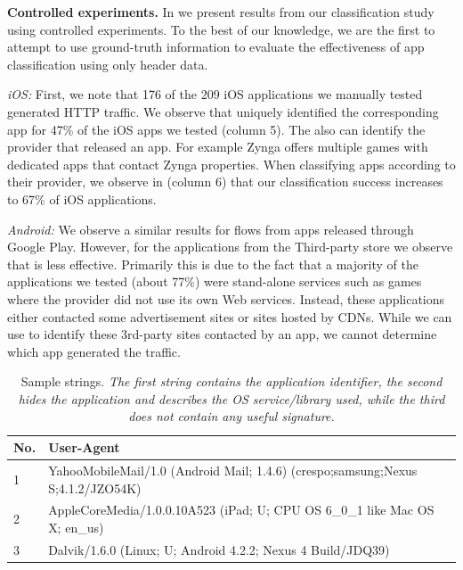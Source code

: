 
\noindent\textbf{Controlled experiments.}
In  we present results from our classification study using controlled experiments. To 
the best of our knowledge, we are the first to attempt to use ground-truth information to evaluate the 
effectiveness of app classification using only header data.
 

\emph{iOS:}
First, we note that 176 of the 209 iOS applications we manually tested generated HTTP traffic.
We observe that \httphost uniquely identified the corresponding app for 47\% of the iOS apps we tested (column 5).
The \httphost also can identify the provider that released an app.
For example Zynga offers multiple games with dedicated apps that contact Zynga properties.
When classifying apps according to their provider, we observe in  (column 6) that our classification success increases to 67\% of iOS applications. 


\emph{Android:} We observe a similar results for flows from apps released through Google Play.
However, for the applications from the Third-party store we observe that \httphost is less effective. 
Primarily this is due to the fact that a majority of the applications we tested (about 77\%) were stand-alone services such as games where the provider did not use its own Web services. Instead, these applications either contacted some advertisement sites or sites hosted by CDNs. 
While we can use \httphost to identify these 3rd-party sites contacted by an app, we cannot determine which app generated the traffic. 

\begin{table}
\begin{small}
\begin{tabular}{|l|p{}|}
\hline
{\bf No. } & {\bf User-Agent}\tabularnewline
\hline
1 & YahooMobileMail/1.0 (Android Mail; 1.4.6) (crespo;samsung;Nexus S;4.1.2/JZO54K)\tabularnewline
\hline
2 & AppleCoreMedia/1.0.0.10A523 (iPad; U; CPU OS 6\_0\_1 like Mac OS X; en\_us) \tabularnewline
\hline
3 & Dalvik/1.6.0 (Linux; U; Android 4.2.2; Nexus 4 Build/JDQ39) \tabularnewline
\hline
\end{tabular}
\end{small}
\caption{Sample \useragent strings. \emph{The first string contains the application identifier, the second hides the application and describes the OS service/library used, while the third does not contain any useful signature.}}
\label{tab:user-agent}
\end{table}

